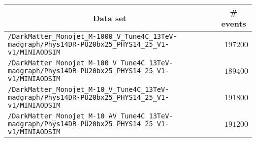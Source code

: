 \begin{center}
\begin{tabular}{lr}
\toprule
\multicolumn{1}{c}{Data set}&\multicolumn{1}{c}{\# events}\tabularnewline
\midrule
\verb!/DarkMatter_Monojet_M-1000_V_Tune4C_13TeV-madgraph/Phys14DR-PU20bx25_PHYS14_25_V1-v1/MINIAODSIM! &$197200$\tabularnewline
\verb!/DarkMatter_Monojet_M-100_V_Tune4C_13TeV-madgraph/Phys14DR-PU20bx25_PHYS14_25_V1-v1/MINIAODSIM! &$189400$\tabularnewline
\verb!/DarkMatter_Monojet_M-10_V_Tune4C_13TeV-madgraph/Phys14DR-PU20bx25_PHYS14_25_V1-v1/MINIAODSIM! &$191800$\tabularnewline
\verb!/DarkMatter_Monojet_M-10_AV_Tune4C_13TeV-madgraph/Phys14DR-PU20bx25_PHYS14_25_V1-v1/MINIAODSIM! &$191200$\tabularnewline
\bottomrule
\end{tabular}\end{center}
